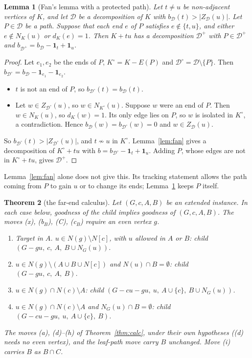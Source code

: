\documentclass[11pt]{amsart}
\newtheorem{theorem}{Theorem}[section]
\newtheorem{lemma}[theorem]{Lemma}
\theoremstyle{definition}
\newcommand{\cD}{\mathcal D}
\begin{document}
\begin{lemma}[Fan's lemma with a protected path]\label{lem:protected}
Let $t\ne u$ be non-adjacent vertices of $K$, and let $\cD$ be a decomposition of $K$ with
$b_\cD(t)>|Z_\cD(u)|$. Let $P\in\cD$ be a path. Suppose that each end $e$ of $P$ satisfies
$e\notin\{t,u\}$, and either $e\notin N_K(u)$ or $d_K(e)=1$. Then $K+tu$ has a decomposition
$\cD^+$ with $P\in\cD^+$ and $b_{\cD^+}=b_\cD-\mathbf 1_t+\mathbf 1_u$.
\end{lemma}

\begin{proof}
Let $e_1,e_2$ be the ends of $P$, $K^\circ=K-E(P)$ and $\cD^\circ=\cD\setminus\{P\}$. Then
$b_{\cD^\circ}=b_\cD-\mathbf 1_{e_1}-\mathbf 1_{e_2}$.
\begin{itemize}
\item $t$ is not an end of $P$, so $b_{\cD^\circ}(t)=b_\cD(t)$.
\item Let $w\in Z_{\cD^\circ}(u)$, so $w\in N_{K^\circ}(u)$. Suppose $w$ were an end of $P$. Then
$w\in N_K(u)$, so $d_K(w)=1$. Its only edge lies on $P$, so $w$ is isolated in $K^\circ$, a
contradiction. Hence $b_\cD(w)=b_{\cD^\circ}(w)=0$ and $w\in Z_\cD(u)$.
\end{itemize}
So $b_{\cD^\circ}(t)>|Z_{\cD^\circ}(u)|$, and $t\not\sim u$ in $K^\circ$. Lemma~\ref{lem:fan}
gives a decomposition of $K^\circ+tu$ with $b=b_{\cD^\circ}-\mathbf 1_t+\mathbf 1_u$. Adding $P$,
whose edges are not in $K^\circ+tu$, gives $\cD^+$.
\end{proof}

Lemma~\ref{lem:fan} alone does not give this. Its tracking statement allows the path coming from
$P$ to gain $u$ or to change its ends; Lemma~\ref{lem:protected} keeps $P$ itself.

\begin{theorem}[the far-end calculus]\label{thm:far}
Let $(G,c,A,B)$ be an extended instance. In each case below, goodness of the child implies
goodness of $(G,c,A,B)$. The moves (x), (b$_B$), (C), (c$_B$) require an even vertex $g$.
\begin{enumerate}[label=(\roman*)]
\item[(x)] \emph{Target in $A$.} $u\in N(g)\setminus N[c]$, \emph{with $u$ allowed in $A$ or $B$}:
child $(G-gu,\ c,\ A,\ B\cup N_G(u))$.
\item[(b$_B$)] $u\in N(g)\setminus(A\cup B\cup N[c])$ and $N(u)\cap B=\emptyset$: child
$(G-gu,\ c,\ A,\ B)$.
\item[(C)] $u\in N(g)\cap N(c)\setminus A$: child $(G-cu-gu,\ u,\ A\cup\{c\},\ B\cup N_G(u))$.
\item[(c$_B$)] $u\in N(g)\cap N(c)\setminus A$ and $N_G(u)\cap B=\emptyset$: child
$(G-cu-gu,\ u,\ A\cup\{c\},\ B)$.
\end{enumerate}
The moves (a), (d)--(h) of Theorem~\ref{thm:calc}, under their own hypotheses ((d) needs no even
vertex), and the leaf-path move carry $B$ unchanged. Move (i) carries $B$ as
$B\cap C$.
\end{theorem}
\end{document}
